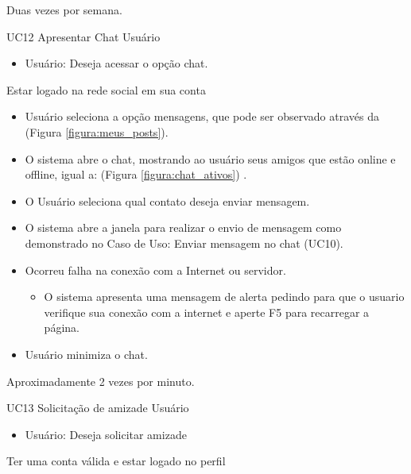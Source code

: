{Duas vezes por semana.}
{

}
\casoDeUso
{UC12}
{Apresentar Chat}
{Usuário}
{
\begin{itemize}
	\item Usuário: Deseja acessar o opção chat.	
\end{itemize}

}
{Estar logado na rede social em sua conta}
{}
{
\begin{itemize}
	\item Usuário seleciona a opção mensagens, que pode ser observado através da (Figura \ref{figura:meus_posts}).	
	\item O sistema abre o chat, mostrando ao usuário seus amigos que estão online  e offline, igual a:  (Figura \ref{figura:chat_ativos}) .	
	\item O Usuário seleciona qual contato deseja enviar mensagem.
	\item O sistema abre a janela para realizar o envio de mensagem como demonstrado no Caso de Uso: Enviar mensagem no chat (UC10).  
					
\end{itemize}
}
{
\begin{itemize}
	\item Ocorreu falha na conexão com a Internet ou servidor.
	\begin{itemize}
	\item O sistema apresenta uma mensagem de alerta pedindo para que o usuario verifique sua conexão com a internet e aperte F5 para recarregar a página. 	
	\end{itemize}
	\item Usuário minimiza o chat. 
\end{itemize}
}
{Aproximadamente 2 vezes por minuto.}
{

}
\casoDeUso
{UC13}
{Solicitação de amizade}
{Usuário}
{
\begin{itemize}
	\item Usuário: Deseja solicitar amizade
\end{itemize}

}
{Ter uma conta válida e estar logado no perfil}
